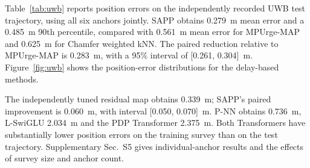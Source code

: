 Table~\ref{tab:uwb} reports position errors on the independently recorded UWB test trajectory, using all six anchors jointly. SAPP obtains 0.279~m mean error and a 0.485~m 90th percentile, compared with 0.561~m mean error for MPUrge-MAP and 0.625~m for Chamfer weighted kNN. The paired reduction relative to MPUrge-MAP is 0.283~m, with a 95\% interval of [0.261, 0.304]~m. Figure~\ref{fig:uwb} shows the position-error distributions for the delay-based methods.

The independently tuned residual map obtains 0.339~m; SAPP's paired improvement is 0.060~m, with interval [0.050, 0.070]~m. P-NN obtains 0.736~m, L-SwiGLU 2.034~m and the PDP Transformer 2.375~m. Both Transformers have substantially lower position errors on the training survey than on the test trajectory. Supplementary Sec.~S5 gives individual-anchor results and the effects of survey size and anchor count.
